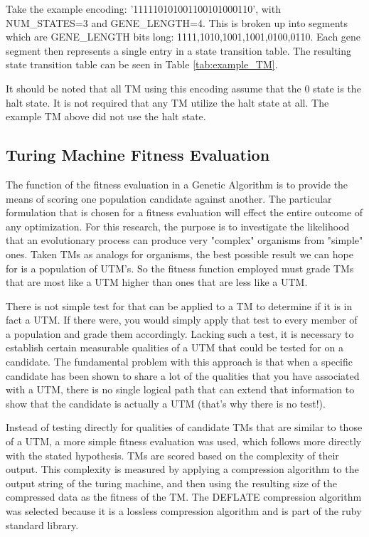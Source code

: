 Take the example encoding: '111110101001100101000110', with NUM\_STATES=3 and GENE\_LENGTH=4. This is broken up into segments which are GENE\_LENGTH bits long: 1111,1010,1001,1001,0100,0110. Each gene segment then represents a single entry in a state transition table. The resulting state transition table can be seen in Table \ref{tab:example_TM}. 

It should be noted that all TM using this encoding assume that the 0 state is the halt state. It is not required that any TM utilize the halt state at all. The example TM above did not use the halt state. 

\subsection{Turing Machine Fitness Evaluation} 

The function of the fitness evaluation in a Genetic Algorithm is to provide the means of scoring one population candidate against another. The particular formulation that is chosen for a fitness evaluation will effect the entire outcome of any optimization. For this research, the purpose is to investigate the likelihood that an evolutionary process can produce very "complex" organisms from "simple" ones. Taken TMs as analogs for organisms, the best possible result we can hope for is a population of UTM's. So the fitness function employed must grade TMs that are most like a UTM higher than ones that are less like a UTM.  

There is not simple test for that can be applied to a TM to determine if it is in fact a UTM. If there were, you would simply apply that test to every member of a population and grade them accordingly. Lacking such a test, it is necessary to establish certain measurable qualities of a UTM that could be tested for on a candidate. The fundamental problem with this approach is that when a specific candidate has been shown to share a lot of the qualities that you have associated with a UTM, there is no single logical path that can extend that information to show that the candidate is actually a UTM (that's why there is no test!). 

Instead of testing directly for qualities of candidate TMs that are similar to those of a UTM, a more simple fitness evaluation was used, which follows more directly with the stated hypothesis. TMs are scored based on the complexity of their output. This complexity is measured by applying a compression algorithm to the output string of the turing machine, and then using the resulting size of the compressed data as the fitness of the TM. The DEFLATE compression algorithm was selected because it is a lossless compression algorithm and is part of the ruby standard library.

